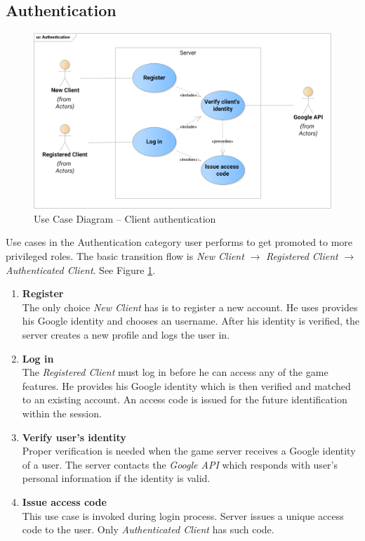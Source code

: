 	\subsection{Authentication}	
	\begin{figure}[h]	
		\includegraphics[width=\textwidth]{figures/UC_Authentication}
		\centering			
		\caption{Use Case Diagram -- Client authentication}
		\label{fig:ucauth}
	\end{figure}
	\noindent Use cases in the Authentication category user performs to get promoted to more privileged roles. The basic transition flow is \textit{New Client} $\rightarrow$ \textit{Registered Client} $\rightarrow$ \textit{Authenticated Client}. See Figure \ref{fig:ucauth}.
	
	\begin{enumerate}
		\item \textbf{Register} \\
		The only choice \textit{New Client} has is to register a new account. He uses provides his Google identity and chooses an username. After his identity is verified, the server creates a new profile and logs the user in.
		
		\item \textbf{Log in} \\
		The \textit{Registered Client} must log in before he can access any of the game features. He provides his Google identity which is then verified and matched to an existing account. An access code is issued for the future identification within the session.		
		
		\item \textbf{Verify user's identity} \\
		Proper verification is needed when the game server receives a Google identity of a user. The server contacts the \textit{Google API} which responds with user's personal information if the identity is valid.
		
		\item \textbf{Issue access code} \\ 
		This use case is invoked during login process. Server issues a unique access code to the user. Only \textit{Authenticated Client} has such code.
	\end{enumerate}
	
